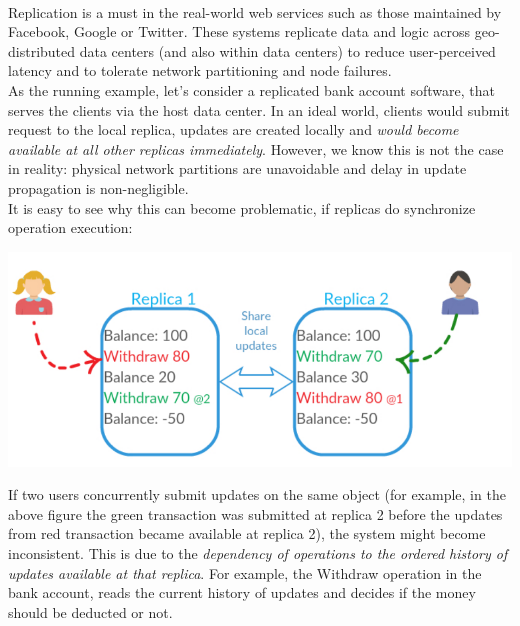 \documentclass[runningheads]{llncs}
\begin{document}
\paragraph{}
Replication is a must in the real-world web services such as those maintained by Facebook, Google or Twitter. These systems replicate data and logic across geo-distributed data centers (and also within data centers) to reduce user-perceived latency and to tolerate network partitioning and node failures. 
\\
As the running example, let's consider a replicated bank account software, that serves the clients via the host data center.  In an ideal world, clients would submit request to the local replica, updates are created locally and \emph{ would become available at all other replicas immediately}. However, we know this is not the case in reality: physical network partitions are unavoidable and delay in update propagation is non-negligible.\\ It is easy to see why this can become problematic, if replicas do synchronize operation execution:
\begin{center}
 \includegraphics[scale = 0.6]{Anom1.pdf}
 \end{center} 
If two users concurrently submit updates on the same object (for example, in the above figure the green transaction was submitted at replica 2 before the updates from red transaction became available at replica 2), the system might become inconsistent. 
This is due to the \emph{dependency of operations to the ordered history of updates available at that replica}. For example, the Withdraw operation in the bank account, reads the current history of updates and decides if the money should be deducted or not. 
\end{document}
